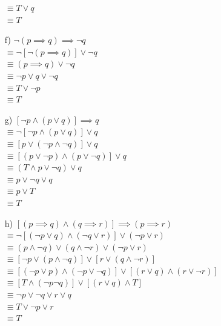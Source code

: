 \documentclass[a4paper]{article}
\begin{document}
\begin{enumerate}
					$\equiv T \lor q  $\\
					$\equiv T$
		\item[f)]   $\lnot(p \implies q) \implies \lnot q $\\
					$\equiv \lnot[\lnot(p \implies q)] \lor \lnot q $\\
					$\equiv (p \implies q) \lor \lnot q $\\
					$\equiv \lnot p \lor q \lor \lnot q $\\
					$\equiv T \lor \lnot p $\\
					$\equiv T$
		\item[g)]   $[\lnot p \land (p \lor q )] \implies q $\\
					$\equiv \lnot [\lnot p \land (p \lor q )] \lor q $\\
					$\equiv  [p \lor (\lnot p \land \lnot q)] \lor q$\\
					$\equiv  [(p \lor \lnot p) \land (p \lor \lnot q )] \lor q$\\ $\equiv (T \land p \lor \lnot q) \lor q$\\
					$\equiv  p \lor \lnot q \lor q $\\
					$\equiv  p \lor T $\\
					$\equiv T$\\
		\item[h)]   $[(p \implies q) \land (q \implies r)] \implies (p \implies r)$\\
					$\equiv \lnot [(\lnot p \lor q) \land (\lnot q \lor r)] \lor (\lnot p \lor r)$\\
					$\equiv (p \land \lnot q) \lor (q \land \lnot r) \lor (\lnot p \lor r)$\\
					$\equiv [\lnot p \lor (p \land \lnot q)] \lor [r \lor (q \land \lnot r)] $\\
					$\equiv [(\lnot p \lor p) \land (\lnot p \lor \lnot q)] \lor [(r \lor q) \land (r \lor \lnot r)]$\\
					$\equiv [T \land (\lnot p \lnot q )] \lor [(r \lor q) \land T]$\\
					$\equiv  \lnot p \lor \lnot q \lor r \lor q $\\
					$\equiv  T \lor \lnot p \lor r$\\
					$\equiv T$\\
	\end{enumerate}
\clearpage
\end{document}
